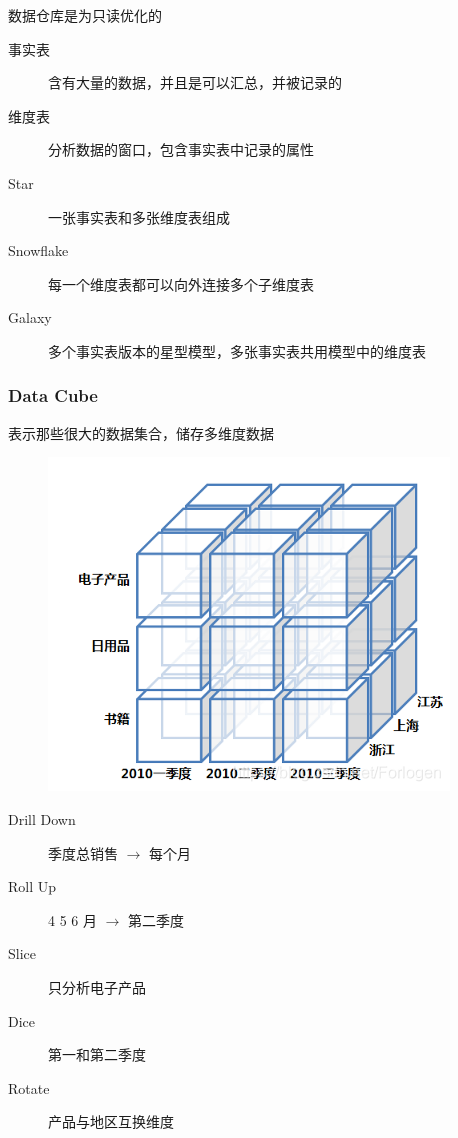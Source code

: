 \documentclass[11pt,journal,compsoc]{IEEEtran}
\begin{document}
数据仓库是为只读优化的

\begin{description}
    \item[事实表] 含有大量的数据，并且是可以汇总，并被记录的

    \item[维度表] 分析数据的窗口，包含事实表中记录的属性

    \item[Star] 一张事实表和多张维度表组成

    \item[Snowflake] 每一个维度表都可以向外连接多个子维度表

    \item[Galaxy] 多个事实表版本的星型模型，多张事实表共用模型中的维度表
\end{description}


\subsubsection{Data Cube}

表示那些很大的数据集合，储存多维度数据

\begin{figure}[H]
    \centering
    \includegraphics[width=\linewidth]{Cube.png}
\end{figure}

\begin{description}
    \item[Drill Down] 季度总销售 $\to$ 每个月

    \item[Roll Up] 4 5 6 月 $\to$ 第二季度

    \item[Slice] 只分析电子产品

    \item[Dice] 第一和第二季度

    \item[Rotate] 产品与地区互换维度
\end{description}
\end{document}
